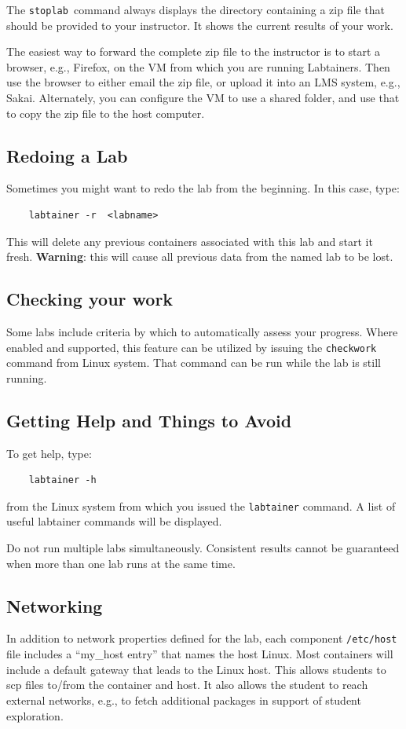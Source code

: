 \documentclass[12pt]{article}
\begin{document}
The {\tt stoplab }command always displays the directory containing a zip file that should be provided to your instructor. It shows the current results of your work. 

The easiest way to forward the complete zip file to the instructor is to start a browser, e.g., Firefox, on the VM from which you
are running Labtainers.  Then use the browser to either email the zip file, or upload it into an LMS system, e.g., Sakai.
Alternately, you can configure the VM to use a shared folder, and use that to copy the zip file to the host computer.

\subsection{Redoing a Lab}
Sometimes you might want to redo the lab from the beginning.  In this case, type:
\begin{verbatim}
    labtainer -r  <labname>
\end{verbatim}
This will delete any previous containers associated with this lab and start it fresh.  \textbf{Warning}: this will cause all previous data from the named lab to be lost.

\subsection{Checking your work}
Some labs include criteria by which to automatically assess your progress.
Where enabled and supported, this feature can be utilized by issuing the {\tt checkwork} command from Linux system.
That command can be run while the lab is still running.

\subsection{Getting Help and Things to Avoid}
To get help, type:
\begin{verbatim}
    labtainer -h
\end{verbatim}
\noindent from the Linux system from which you issued the {\tt labtainer} command. A list of useful labtainer commands will be displayed.

Do not run multiple labs simultaneously.  Consistent results cannot be guaranteed when more than one lab runs at the same time.

\subsection{Networking}
In addition to network properties defined for the lab,
each component \texttt{/etc/host} file includes a ``my\_host entry'' that names
the host Linux.  Most containers will include a default gateway that
leads to the Linux host.  This allows students to scp files to/from the container and host.
It also allows the student to reach external networks, e.g., to fetch additional packages in
support of student exploration.
\end{document}
